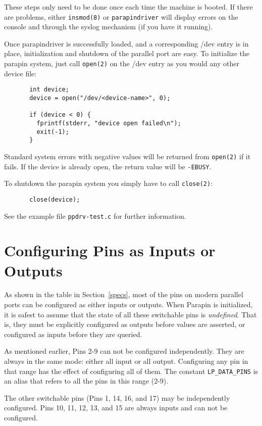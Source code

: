 \documentclass{article}
\begin{document}
These steps only need to be done once each time
the machine is booted.  If there are problems, either {\tt insmod(8)} or
{\tt parapindriver} will display errors on the console and through the
syslog mechanism (if you have it running).

Once parapindriver is successfully loaded, and a corresponding /dev
entry is in place, initialization and shutdown of the parallel port
are easy.  To
initialize the parapin system, just call {\tt open(2)} on
the /dev entry as you would any other device file:

\begin{verbatim}
       int device;
       device = open("/dev/<device-name>", 0);

       if (device < 0) {
         fprintf(stderr, "device open failed\n");
         exit(-1);
       }
\end{verbatim}

Standard system errors with negative values will be returned from
{\tt open(2)} if it fails.  If the device is already open, the return
value will be {\tt -EBUSY}.

To shutdown the parapin system you simply have to call {\tt close(2)}:

\begin{verbatim}
       close(device);
\end{verbatim}

See the example file {\tt ppdrv-test.c} for further information.

\section{Configuring Pins as Inputs or Outputs}
\label{configuring}

As shown in the table in Section~\ref{specs}, most of the pins on
modern parallel ports can be configured as either inputs or outputs.
When Parapin is initialized, it is safest to assume that the state of
all these switchable pins is {\em undefined}.  That is, they must be
explicitly configured as outputs before values are asserted, or
configured as inputs before they are queried.

As mentioned earlier, Pins 2-9 can not be configured independently.
They are always in the same mode: either all input or all output.
Configuring any pin in that range has the effect of configuring all of
them.  The constant {\tt LP\_DATA\_PINS} is an alias that refers to
all the pins in this range (2-9).

The other switchable pins (Pins 1, 14, 16, and 17) may be
independently configured.  Pins 10, 11, 12, 13, and 15 are always
inputs and can not be configured.
\end{document}
